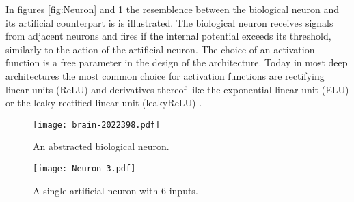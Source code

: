 In figures \ref{fig:Neuron}  and \ref{fig:ArtNeuron} the resemblence between the biological neuron and its artificial counterpart is is illustrated. The biological neuron receives signals from adjacent neurons and fires if the internal potential exceeds its threshold, similarly to the action of the artificial neuron.
The choice of an activation function is a free parameter in the design of the architecture. Today in most deep architectures the most common choice for activation functions are rectifying linear units (ReLU) and derivatives thereof like the exponential linear unit (ELU) \cite{Clevert2015} or the leaky rectified linear unit (leakyReLU) \cite{Maas2013}.

\begin{figure}[H]
\centering
  \texttt{[image: brain-2022398.pdf]}
  \caption{An abstracted biological neuron.}
  \label{fig:Neuron}
  \texttt{[image: Neuron\_3.pdf]}
  \caption{A single artificial neuron with $6$ inputs.}
  \label{fig:ArtNeuron}
\end{figure}



